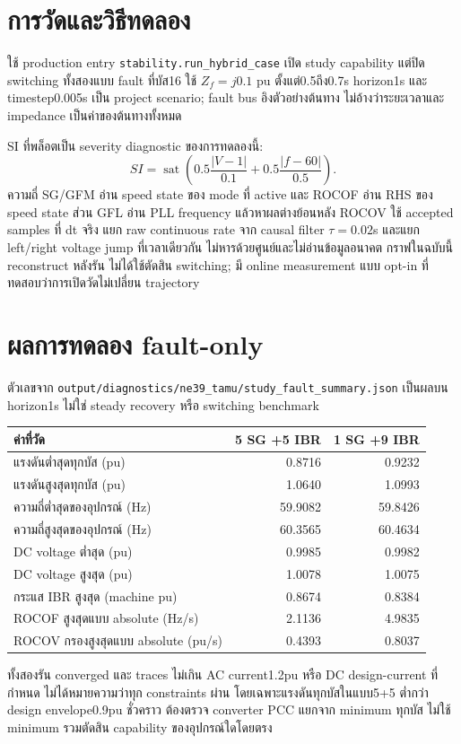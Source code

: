 \documentclass[12pt,a4paper]{article}
\begin{document}
\section{การวัดและวิธีทดลอง}
ใช้ production entry \texttt{stability.run\_hybrid\_case} เปิด study capability แต่ปิด switching ทั้งสองแบบ fault ที่บัส16 ใช้ $Z_f=j0.1$ pu ตั้งแต่0.5ถึง0.7s horizon1s และ timestep0.005s เป็น project scenario; fault bus อิงตัวอย่างต้นทาง ไม่อ้างว่าระยะเวลาและ impedance เป็นค่าของต้นทางทั้งหมด

SI ที่พล็อตเป็น severity diagnostic ของการทดลองนี้:
\[
SI=\operatorname{sat}\left(0.5\frac{|V-1|}{0.1}+0.5\frac{|f-60|}{0.5}\right).
\]
ความถี่ SG/GFM อ่าน speed state ของ mode ที่ active และ ROCOF อ่าน RHS ของ speed state ส่วน GFL อ่าน PLL frequency แล้วหาผลต่างย้อนหลัง ROCOV ใช้ accepted samples ที่ dt จริง แยก raw continuous rate จาก causal filter $\tau=0.02$s และแยก left/right voltage jump ที่เวลาเดียวกัน ไม่หารด้วยศูนย์และไม่อ่านข้อมูลอนาคต กราฟในฉบับนี้ reconstruct หลังรัน ไม่ได้ใช้ตัดสิน switching; มี online measurement แบบ opt-in ที่ทดสอบว่าการเปิดวัดไม่เปลี่ยน trajectory

\section{ผลการทดลอง fault-only}
ตัวเลขจาก \texttt{output/diagnostics/ne39\_tamu/study\_fault\_summary.json} เป็นผลบน horizon1s ไม่ใช่ steady recovery หรือ switching benchmark
\begin{center}
\begin{tabular}{lrr}
\toprule
ค่าที่วัด &5 SG +5 IBR&1 SG +9 IBR\\
\midrule
แรงดันต่ำสุดทุกบัส (pu)&0.8716&0.9232\\
แรงดันสูงสุดทุกบัส (pu)&1.0640&1.0993\\
ความถี่ต่ำสุดของอุปกรณ์ (Hz)&59.9082&59.8426\\
ความถี่สูงสุดของอุปกรณ์ (Hz)&60.3565&60.4634\\
DC voltage ต่ำสุด (pu)&0.9985&0.9982\\
DC voltage สูงสุด (pu)&1.0078&1.0075\\
กระแส IBR สูงสุด (machine pu)&0.8674&0.8384\\
ROCOF สูงสุดแบบ absolute (Hz/s)&2.1136&4.9835\\
ROCOV กรองสูงสุดแบบ absolute (pu/s)&0.4393&0.8037\\
\bottomrule
\end{tabular}
\end{center}
ทั้งสองรัน converged และ traces ไม่เกิน AC current1.2pu หรือ DC design-current ที่กำหนด ไม่ได้หมายความว่าทุก constraints ผ่าน โดยเฉพาะแรงดันทุกบัสในแบบ5+5 ต่ำกว่า design envelope0.9pu ชั่วคราว ต้องตรวจ converter PCC แยกจาก minimum ทุกบัส ไม่ใช้ minimum รวมตัดสิน capability ของอุปกรณ์ใดโดยตรง
\end{document}

